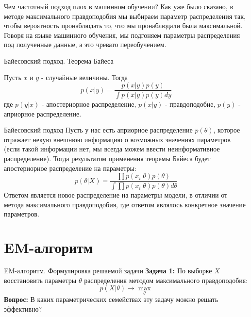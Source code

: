 \documentclass[russian]{vegapresentation}
\begin{document}
    	\begin{frame}{Чем частотный подход плох в машинном обучении?}
		Как уже было сказано, в методе максимального правдоподобия мы выбираем параметр распределения так, чтобы вероятность пронаблюдать то, что мы пронаблюдали была максимальной. Говоря на языке машинного обучения, мы подгоняем параметры распределения под полученные данные, а это чревато переобучением.
    \end{frame}
    
    \begin{frame}{Байесовский подход. Теорема Байеса}
     	\begin{theorem}
     		Пусть $x$ и $y$ - случайные величины. Тогда \\
     		\begin{equation}
     			p(x|y) = \frac{p(x|y)p(y)}{\int p(x|y)p(y)dy}
     		\end{equation} 
     		где $p(y|x)$ - апостериорное распределение, $p(x|y)$ - правдоподобие, $p(y)$ - априорное распределение.
     	\end{theorem}
    \end{frame}
    
    \begin{frame}{Байесовский подход}
		Пусть у нас есть априорное распределение $p(\theta)$, которое отражает некую внешнюю информацию о возможных значениях параметров (если такой информации нет, мы всегда можем ввести неинформативное распределение). Тогда результатом применения теоремы Байеса будет апостериорное распределение на параметры:
		\begin{equation}
                    p(\theta|X) = \frac{\prod p(x_i| \theta)p(\theta)}{\int \prod p(x_i|\theta)p(\theta)d\theta}
         \end{equation}
         Ответом является новое распределение на параметры модели, в отличии от метода максимального правдоподобия, где ответом являлось конкретное значение параметров.
    \end{frame}
    
    \section{EM-алгоритм}
    \begin{frame}{EM-алгоритм. Формулировка решаемой задачи}
		\textbf{Задача 1:} По выборке $X$ восстановить параметры $\theta$  распределения методом максимального правдоподобия:
		\begin{equation}
			p(X|\theta) \rightarrow \max_\theta
		\end{equation}
		\textbf{Вопрос: } В каких параметрических семействах эту задачу можно решать эффективно?
    \end{frame}
\end{document}
